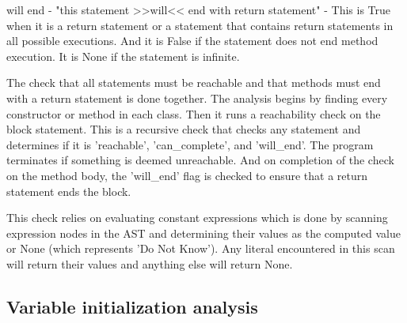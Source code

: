 \documentclass[12pt]{article}
\begin{document}
will end - "this statement >>will<< end with return statement" -
    This is True when it is a return statement
    or a statement that contains return statements in all possible
    executions.
    And it is False if the statement does not end method execution.
    It is None if the statement is infinite.

The check that all statements must be reachable and that methods must end with
a return statement is done together.
The analysis begins by finding every constructor or method in each class.
Then it runs a reachability check on the block statement.
This is a recursive check that checks any statement and determines if it is
'reachable', 'can_complete', and 'will_end'.
The program terminates if something is deemed
unreachable. And on completion of the check on the method body, the 'will_end'
flag is checked to ensure that a return statement ends the block.

This check relies on evaluating constant expressions which is done by scanning expression
nodes in the AST and determining their values as the computed value or None
(which represents 'Do Not Know'). Any literal encountered in this scan will return their
values and anything else will return None.

\subsection{Variable initialization analysis}
\end{document}
